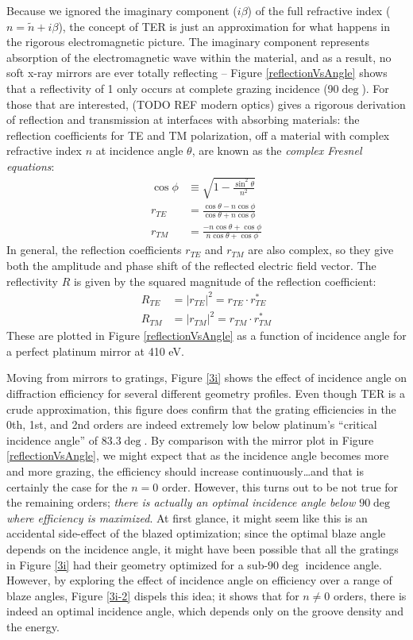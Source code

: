 Because we ignored the imaginary component ($i \beta$) of the full refractive index ($n = \tilde n + i \beta$), the concept of TER is just an approximation for what happens in the rigorous electromagnetic picture.  The imaginary component represents absorption of the electromagnetic wave within the material, and as a result, no soft x-ray mirrors are ever totally reflecting -- Figure \ref{reflectionVsAngle} shows that a reflectivity of 1 only occurs at complete grazing incidence (90$\deg$).  For those that are interested, (TODO REF modern optics) gives a rigorous derivation of reflection and transmission at interfaces with absorbing materials: the reflection coefficients for TE and TM polarization, off a material with complex refractive index $n$ at incidence angle $\theta$, are known as the \emph{complex Fresnel equations}:
\begin{align}
\cos \phi &\equiv \sqrt{1 - \frac{\sin^2 \theta}{n^2} } \\
r_{TE} &=     \frac{\cos \theta - n \cos \phi}     {\cos \theta + n \cos \phi} \\
r_{TM} &=    \frac{-n \cos \theta + \cos \phi}              {n \cos \theta + \cos \phi}
\end{align}
In general, the reflection coefficients $r_{TE}$ and $r_{TM}$ are also complex, so they give both the amplitude and phase shift of the reflected electric field vector.  The reflectivity $R$ is given by the squared magnitude of the reflection coefficient:
\begin{align}
R_{TE} &= | r_{TE} | ^2 =  r_{TE} \cdot r_{TE}^\ast \\
R_{TM} &= | r_{TM} | ^2 = r_{TM} \cdot r_{TM}^\ast
\end{align}
These are plotted in Figure \ref{reflectionVsAngle} as a function of incidence angle for a perfect platinum mirror at 410 eV.

Moving from mirrors to gratings, Figure \ref{3i} shows the effect of incidence angle on diffraction efficiency for several different geometry profiles.  Even though TER is a crude approximation, this figure does confirm that the grating efficiencies in the 0th, 1st, and 2nd orders are indeed extremely low below platinum's ``critical incidence angle'' of 83.3$\deg$.    By comparison with the mirror plot in Figure \ref{reflectionVsAngle}, we might expect that as the incidence angle becomes more and more grazing, the efficiency should increase continuously\ldots and that is certainly the case for the $n=0$ order.  However, this turns out to be not true for the remaining orders; \emph{there is actually an optimal incidence angle below $90\deg$ where efficiency is maximized}.  At first glance, it might seem like this is an accidental side-effect of the blazed optimization; since the optimal blaze angle depends on the incidence angle, it might have been possible that all the gratings in Figure \ref{3i} had their geometry optimized for a sub-$90\deg$ incidence angle.  However, by exploring the effect of incidence angle on efficiency over a range of blaze angles, Figure \ref{3i-2} dispels this idea; it shows that for $n\neq 0$ orders, there is indeed an optimal incidence angle, which depends only on the groove density and the energy.

